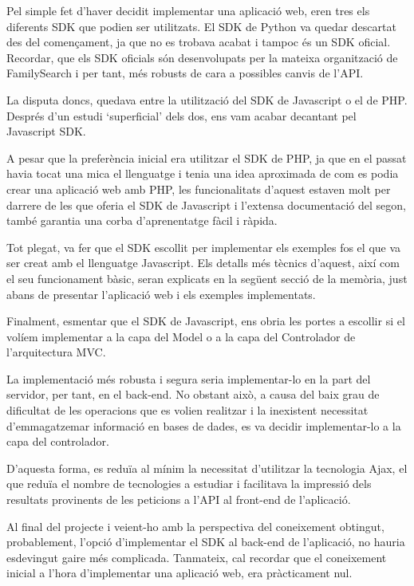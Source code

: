     Pel simple fet d'haver decidit implementar una aplicació web, eren tres els diferents SDK que podien ser utilitzats. El SDK de Python va quedar descartat des del començament, ja que no es trobava acabat i tampoc és un SDK oficial. Recordar, que els SDK oficials són desenvolupats per la mateixa organització de FamilySearch i per tant, més robusts de cara a possibles canvis de l’API.

    La disputa doncs, quedava entre la utilització del SDK de Javascript o el de PHP. Després d’un estudi `superficial’ dels dos, ens vam acabar decantant pel Javascript SDK.

    A pesar que la preferència inicial era utilitzar el SDK de PHP, ja que en el passat havia tocat una mica el llenguatge i tenia una idea aproximada de com es podia crear una aplicació web amb PHP, les funcionalitats d'aquest estaven molt per darrere de les que oferia el SDK de Javascript i l'extensa documentació del segon, també garantia una corba d'aprenentatge fàcil i ràpida.

    Tot plegat, va fer que el SDK escollit per implementar els exemples fos el que va ser creat amb el llenguatge Javascript. Els detalls més tècnics d'aquest, així com el seu funcionament bàsic, seran explicats en la següent secció de la memòria, just abans de presentar l’aplicació web i els exemples implementats.

    Finalment, esmentar que el SDK de Javascript, ens obria les portes a escollir si el volíem implementar a la capa del Model o a la capa del Controlador de l'arquitectura MVC.

    La implementació més robusta i segura seria implementar-lo en la part del servidor, per tant, en el back-end. No obstant això, a causa del baix grau de dificultat de les operacions que es volien realitzar i la inexistent necessitat d’emmagatzemar informació en bases de dades, es va decidir implementar-lo a la capa del controlador.

    D'aquesta forma, es reduïa al mínim la necessitat d’utilitzar la tecnologia Ajax, el que reduïa el nombre de tecnologies a estudiar i facilitava la impressió dels resultats provinents de les peticions a l’API al front-end de l'aplicació.

    Al final del projecte i veient-ho amb la perspectiva del coneixement obtingut, probablement, l’opció d’implementar el SDK al back-end  de l’aplicació, no hauria esdevingut gaire més complicada. Tanmateix, cal recordar que el coneixement inicial a l’hora d’implementar una aplicació web, era pràcticament nul.

